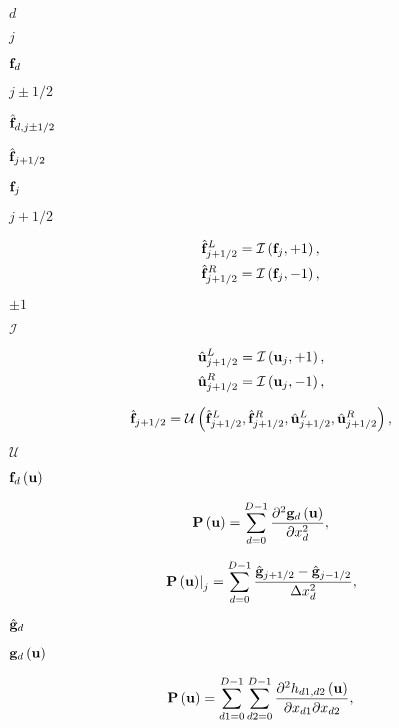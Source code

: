 \documentclass{article}
\begin{document}
$d$
\pagebreak

$j$
\pagebreak

${\bf f}_d$
\pagebreak

$j\pm1/2$
\pagebreak

$\hat{\bf f}_{d,j\pm 1/2}$
\pagebreak

$\hat{\bf f}_{j+1/2}$
\pagebreak

${\bf f}_j$
\pagebreak

$j+1/2$
\pagebreak

\begin{align} \hat{\bf f}^L_{j+1/2} &= \mathcal{I}\left({\bf f}_j,+1\right), \\ \hat{\bf f}^R_{j+1/2} &= \mathcal{I}\left({\bf f}_j,-1\right), \end{align}
\pagebreak

$\pm 1$
\pagebreak

$\mathcal{I}$
\pagebreak

\begin{align} \hat{\bf u}^L_{j+1/2} &= \mathcal{I}\left({\bf u}_j,+1\right), \\ \hat{\bf u}^R_{j+1/2} &= \mathcal{I}\left({\bf u}_j,-1\right), \end{align}
\pagebreak

\begin{equation} \hat{\bf f}_{j+1/2} = \mathcal{U}\left( \hat{\bf f}^L_{j+1/2}, \hat{\bf f}^R_{j+1/2}, \hat{\bf u}^L_{j+1/2}, \hat{\bf u}^R_{j+1/2} \right), \end{equation}
\pagebreak

$\mathcal{U}$
\pagebreak

${\bf f}_d\left({\bf u}\right)$
\pagebreak

\begin{equation} {\bf P}\left({\bf u}\right) = \sum_{d=0}^{D-1} \frac {\partial^2 {\bf g}_d\left(\bf u\right)} {\partial x_d^2}, \end{equation}
\pagebreak

\begin{equation} \left.{\bf P}\left({\bf u}\right)\right|_j = \sum_{d=0}^{D-1} \frac { \hat{\bf g}_{j+1/2} - \hat{\bf g}_{j-1/2} } {\Delta x_d^2}, \end{equation}
\pagebreak

$\hat{\bf g}_d$
\pagebreak

${\bf g}_d\left({\bf u}\right)$
\pagebreak

\begin{equation} {\bf P}\left({\bf u}\right) = \sum_{d1=0}^{D-1}\sum_{d2=0}^{D-1} \frac {\partial^2 h_{d1,d2}\left(\bf u\right)} {\partial x_{d1} \partial x_{d2}}, \end{equation}
\pagebreak
\end{document}
